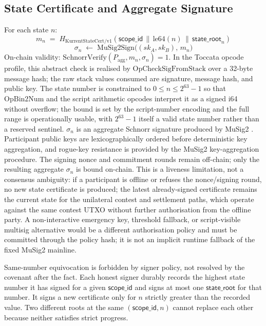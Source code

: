 \documentclass[10pt,a4paper]{article}
\begin{document}
\subsection{State Certificate and Aggregate Signature}
\label{sec:state-cert}

For each state $n$:
\[
  m_n \;=\; H_{\mathrm{KurrentStateCert/v1}}
   (\mathsf{scope\_id} \,\|\, \mathrm{le64}(n) \,\|\, \mathsf{state\_root}_n)
\]
\[
  \sigma_n \;\leftarrow\; \mathrm{MuSig2Sign}
   \bigl((sk_A, sk_B),\, m_n\bigr)
\]
On-chain validity:
$\mathrm{SchnorrVerify}(P_{\mathrm{agg}}, m_n, \sigma_n) = 1$. In the Toccata opcode profile, this abstract check is realised by $\mathrm{OpCheckSigFromStack}$ over a 32-byte message hash; the raw stack values consumed are signature, message hash, and public key. The state number is constrained to $0 \le n \le 2^{63}-1$ so that $\mathrm{OpBin2Num}$ and the script arithmetic opcodes interpret it as a signed i64 without overflow; the bound is set by the script-number encoding and the full range is operationally usable, with $2^{63}-1$ itself a valid state number rather than a reserved sentinel. $\sigma_n$ is an aggregate Schnorr signature produced by MuSig2 \cite{musig2}. Participant public keys are lexicographically ordered before deterministic key aggregation, and rogue-key resistance is provided by the MuSig2 key-aggregation procedure. The signing nonce and commitment rounds remain off-chain; only the resulting aggregate $\sigma_n$ is bound on-chain. This is a liveness limitation, not a consensus ambiguity: if a participant is offline or refuses the nonce/signing round, no new state certificate is produced; the latest already-signed certificate remains the current state for the unilateral contest and settlement paths, which operate against the same contest UTXO without further authorisation from the offline party. A non-interactive emergency key, threshold fallback, or script-visible multisig alternative would be a different authorisation policy and must be committed through the policy hash; it is not an implicit runtime fallback of the fixed MuSig2 mainline.

Same-number equivocation is forbidden by signer policy, not resolved by the covenant after the fact. Each honest signer durably records the highest state number it has signed for a given $\mathsf{scope\_id}$ and signs at most one $\mathsf{state\_root}$ for that number. It signs a new certificate only for $n$ strictly greater than the recorded value. Two different roots at the same $(\mathsf{scope\_id}, n)$ cannot replace each other because neither satisfies strict progress.
\end{document}
